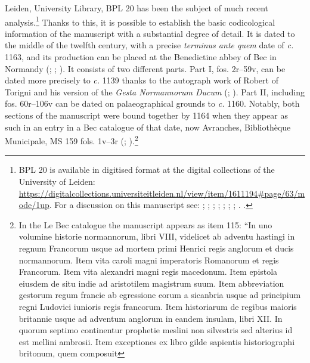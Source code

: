 \begin{paper}
Leiden, University Library, BPL 20 has been the subject of much recent
analysis.\footnote{BPL 20 is available in digitised format at the
  digital collections of the University of Leiden:
  \url{https://digitalcollections.universiteitleiden.nl/view/item/1611194\#page/63/mode/1up}.
  For a discussion on this manuscript see: \cite[cix]{van_houts_gesta_1992}; \cite[23--25]{crick_historia_1991}; \cite[58--64]{pohl_abbas_2014}; \cite[101--102]{pohl_robert_2018}; \cite[94--95]{cleaver_autograph_2018}; \cite[150]{weston_manuscripts_2017}; \cite[289--298]{avril_notes_1964}; \cite[2--6]{dumville_early_1985}.
  \cite[80--81]{hermans_history_1983}.} Thanks to this, it is possible to
establish the basic codicological information of the manuscript with a
substantial degree of detail. It is dated to the middle of the twelfth
century, with a precise \emph{terminus ante quem} date of \emph{c.} 1163,
and its production can be placed at the Benedictine abbey of Bec in
Normandy (\cite[211]{avril_notes_1964}; \cite[80--81]{hermans_history_1983}; \cite[4]{dumville_early_1985}). It consists of two different parts. Part I, fos. 2r--59v, can
be dated more precisely to \emph{c.} 1139 thanks to the autograph work
of Robert of Torigni and his version of the \emph{Gesta Normannorum
Ducum} (\cite[cix]{van_houts_gesta_1992}; \cite[23--25]{crick_historia_1991}). Part II, including fos.
60r--106v can be dated on palaeographical grounds to \emph{c.} 1160.
Notably, both sections of the manuscript were bound together by 1164
when they appear as such in an entry in a Bec catalogue of that date,
now Avranches, Bibliothèque Municipale, MS 159 fols. 1v--3r (\cite[190--205]{pohl_monastic_2017}; \cite[2--4]{dumville_early_1985}).\footnote{In the Le Bec catalogue the
  manuscript appears as item 115: ``In uno volumine historie
  normannorum, libri VIII, videlicet ab adventu hastingi in regnum
  Francorum usque ad mortem primi Henrici regis anglorum et ducis
  normannorum. Item vita caroli magni imperatoris Romanorum et regis
  Francorum. Item vita alexandri magni regis macedonum. Item epistola
  eiusdem de situ indie ad aristotilem magistrum suum. Item abbreviation
  gestorum regum francie ab egressione eorum a sicanbria usque ad
  principium regni Ludovici iunioris regis francorum. Item historiarum
  de regibus maioris britannie usque ad adventum anglorum in eandem
  insulam, libri XII. In quorum septimo continentur prophetie meslini
  non silvestris sed alterius id est mellini ambrosii. Item exceptiones
  ex libro gilde sapientis historiographi britonum, quem composuit
}
\end{paper}
